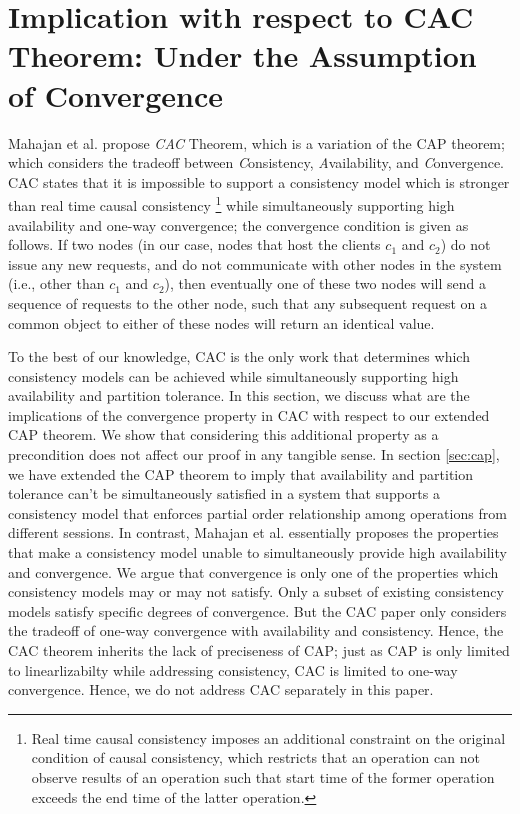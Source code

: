 \documentclass[journal,compsoc]{IEEEtran}
\begin{document}
\section{Implication with respect to CAC Theorem: Under the Assumption of Convergence} 
Mahajan et al. \cite{mahajan11cacTR}  propose  \emph{CAC} Theorem, which is a variation of the CAP theorem; which considers the tradeoff between \emph{C}onsistency,  \emph{A}vailability, and  \emph{C}onvergence. 
 CAC states that it is impossible to support a consistency model  which is stronger than real time causal consistency \footnote{Real time causal consistency imposes an additional constraint on the original condition of causal consistency, which restricts that an operation can not observe results of an operation such that start time of the former operation exceeds the end time of the latter operation.} while simultaneously supporting high availability and one-way convergence;  the convergence condition \cite{mahajan11cacTR} is given as follows. If two nodes (in our case, nodes that host the clients $c_1$ and $c_2$) do not issue any new requests, and do not communicate with other nodes in the system (i.e., other than $c_1$ and $c_2$), then eventually one of these two nodes will send a sequence of requests to the other node, such that any subsequent request on a common object to either of these nodes will return an identical value.  
 \par To the best of our knowledge, CAC is the only work that determines which consistency models can be achieved while simultaneously supporting high availability and partition tolerance. In this section, we discuss what are the implications of the convergence property in CAC with respect to our extended CAP theorem. We show that considering this additional  property as a precondition does not affect our proof in any tangible sense. 
 In section  \ref{sec:cap}, we have extended the CAP theorem to imply that availability and partition tolerance can't be simultaneously satisfied in a system that supports  a consistency model that enforces partial order relationship among operations from different sessions.  In contrast, Mahajan et al. essentially proposes the properties that make a consistency model unable to simultaneously provide high availability and convergence.   We argue that convergence is only one of  the properties which consistency models may or may not satisfy. Only a subset of existing consistency models satisfy specific degrees of convergence. But the CAC paper only considers the tradeoff of one-way convergence with availability and consistency. Hence, the CAC theorem inherits the lack of preciseness of CAP; just as CAP is only limited to linearlizabilty while addressing consistency, CAC is limited to one-way convergence. Hence, we do not address CAC separately in this paper.  
\end{document}
